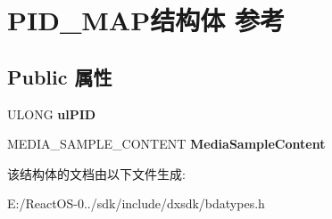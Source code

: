 \hypertarget{struct_p_i_d___m_a_p}{}\section{P\+I\+D\+\_\+\+M\+A\+P结构体 参考}
\label{struct_p_i_d___m_a_p}
\subsection*{Public 属性}
\begin{DoxyCompactItemize}
\item 
\mbox{\label{struct_p_i_d___m_a_p_a122c0effb824d152c5bb39797299fd73}} 
U\+L\+O\+NG {\bfseries ul\+P\+ID}
\item 
\mbox{\label{struct_p_i_d___m_a_p_a1546c2363ab8d56686a615b249dcb9ff}} 
M\+E\+D\+I\+A\+\_\+\+S\+A\+M\+P\+L\+E\+\_\+\+C\+O\+N\+T\+E\+NT {\bfseries Media\+Sample\+Content}
\end{DoxyCompactItemize}


该结构体的文档由以下文件生成\+:\begin{DoxyCompactItemize}
\item 
E\+:/\+React\+O\+S-\/0../sdk/include/dxsdk/bdatypes.\+h\end{DoxyCompactItemize}
